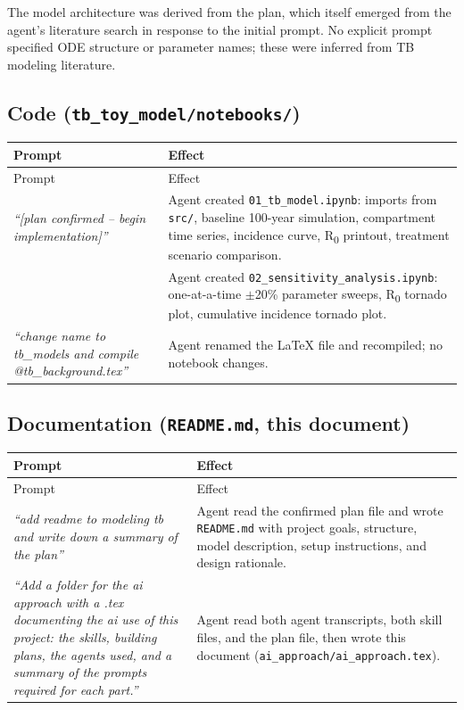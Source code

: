 \documentclass[11pt]{article}
\begin{document}
\noindent The model architecture was derived from the plan, which itself emerged from the agent's literature search in response to the initial prompt. No explicit prompt specified ODE structure or parameter names; these were inferred from TB modeling literature.

\subsection{Code (\texttt{tb\_toy\_model/notebooks/})}

\begin{longtable}{@{}p{6cm}p{7.3cm}@{}}
\toprule
Prompt & Effect \\
\midrule
\endfirsthead
\toprule
Prompt & Effect \\
\midrule
\endhead
\textit{``[plan confirmed -- begin implementation]''} & Agent created \texttt{01\_tb\_model.ipynb}: imports from \texttt{src/}, baseline 100-year simulation, compartment time series, incidence curve, R\textsubscript{0} printout, treatment scenario comparison. \\
& Agent created \texttt{02\_sensitivity\_analysis.ipynb}: one-at-a-time $\pm$20\% parameter sweeps, R\textsubscript{0} tornado plot, cumulative incidence tornado plot. \\
\textit{``change name to tb\_models and compile @tb\_background.tex''} & Agent renamed the LaTeX file and recompiled; no notebook changes. \\
\bottomrule
\end{longtable}

\subsection{Documentation (\texttt{README.md}, this document)}

\begin{longtable}{@{}p{6cm}p{7.3cm}@{}}
\toprule
Prompt & Effect \\
\midrule
\endfirsthead
\toprule
Prompt & Effect \\
\midrule
\endhead
\textit{``add readme to modeling tb and write down a summary of the plan''} & Agent read the confirmed plan file and wrote \texttt{README.md} with project goals, structure, model description, setup instructions, and design rationale. \\
\textit{``Add a folder for the ai approach with a .tex documenting the ai use of this project: the skills, building plans, the agents used, and a summary of the prompts required for each part.''} & Agent read both agent transcripts, both skill files, and the plan file, then wrote this document (\texttt{ai\_approach/ai\_approach.tex}). \\
\bottomrule
\end{longtable}
\end{document}
